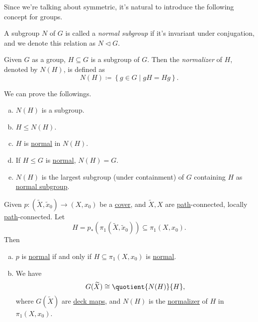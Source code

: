 Since we're talking about symmetric, it's natural to introduce the following concept for groups.

\begin{definition}\label{def:normal-subgroup}
	A subgroup \(N\) of \(G\) is called a \emph{normal subgroup} if it's invariant under conjugation, and we denote this relation as \(N \triangleleft G\).
\end{definition}

\begin{definition}[Normalizer]\label{def:normalizer}
	Given \(G\) as a group, \(H\subseteq G\) is a subgroup of \(G\). Then the \emph{normalizer} of \(H\), denoted by \(N(H)\), is defined as
	\[
		N(H) \coloneqq \left\{g\in G \mid gH = H g\right\}.
	\]
\end{definition}

\begin{exercise}
	We can prove the followings.
	\begin{enumerate}[(a)]
		\item \(N(H)\) is a subgroup.
		\item \(H\leq N(H)\).
		\item \(H\) is \hyperref[def:normal-subgroup]{normal} in \(N(H)\).
		\item If \(H\leq G\) is \hyperref[def:normal-subgroup]{normal}, \(N(H) = G\).
		\item \(N(H)\) is the largest subgroup (under containment) of \(G\) containing \(H\) as \hyperref[def:normal-subgroup]{normal subgroup}.
	\end{enumerate}
\end{exercise}

\begin{proposition}\label{prop:lec17}
	Given \(p\colon (\widetilde{X} , \widetilde{x} _0)\to (X, x_0)\) be a \hyperref[def:covering-map]{cover}, and \(\widetilde{X} , X\) are \hyperref[def:path]{path}-connected, locally \hyperref[def:path]{path}-connected. Let
	\[
		H = p_\ast (\pi _1(\widetilde{X} , \widetilde{x} _0))\subseteq \pi _1(X, x_0).
	\]
	Then
	\begin{enumerate}[(a)]
		\item \(p\) is \hyperref[def:normal-cover]{normal} if and only if \(H\subseteq \pi _1(X, x_0)\) is \hyperref[def:normal-subgroup]{normal}.
		\item We have
		      \[
			      G(\widetilde{X} )\cong \quotient{N(H)}{H},
		      \]
		      where \(G(\widetilde{X} )\) are \hyperref[def:deck-transformation]{deck maps}, and \(N(H)\) is the \hyperref[def:normalizer]{normalizer} of \(H\) in \(\pi _1(X, x_0)\).
	\end{enumerate}
\end{proposition}

